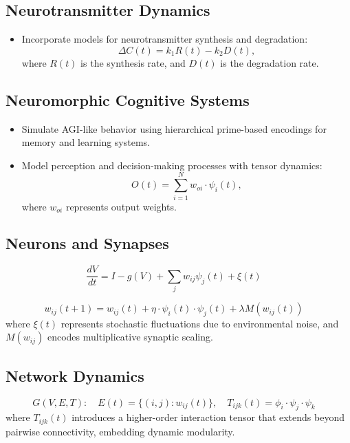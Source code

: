 \documentclass{article}
\theoremstyle{plain}
\begin{document}
\begin{itemize}
\begin{itemize}
\subsection{Neurotransmitter Dynamics}
\begin{itemize}
    \item Incorporate models for neurotransmitter synthesis and degradation:
    \[
    \Delta C(t) = k_1 R(t) - k_2 D(t),
    \]
    where \(R(t)\) is the synthesis rate, and \(D(t)\) is the degradation rate.
\end{itemize}

\subsection{Neuromorphic Cognitive Systems}
\begin{itemize}
    \item Simulate AGI-like behavior using hierarchical prime-based encodings for memory and learning systems.
    \item Model perception and decision-making processes with tensor dynamics:
    \[
    O(t) = \sum_{i=1}^N w_{oi} \cdot \psi_i(t),
    \]
    where \(w_{oi}\) represents output weights.
\end{itemize}
\subsection{Neurons and Synapses}
\begin{equation}
    \frac{dV}{dt} = I - g(V) + \sum_j w_{ij} \psi_j(t) + \xi(t) 
    \quad 
\end{equation}

\begin{equation}
    w_{ij}(t+1) = w_{ij}(t) + \eta \cdot \psi_i(t) \cdot \psi_j(t) + \lambda M(w_{ij}(t)) 
    \quad
\end{equation}
where $\xi(t)$ represents stochastic fluctuations due to environmental noise, and $M(w_{ij})$ encodes multiplicative synaptic scaling.

\subsection{Network Dynamics}
\begin{equation}
    G(V, E, T): \quad E(t) = \{(i, j): w_{ij}(t)\}, \quad 
    T_{ijk}(t) = \phi_i \cdot \psi_j \cdot \psi_k 
    \quad 
\end{equation}
where $T_{ijk}(t)$ introduces a higher-order interaction tensor that extends beyond pairwise connectivity, embedding dynamic modularity.


\end{itemize}
\end{itemize}
\end{document}
